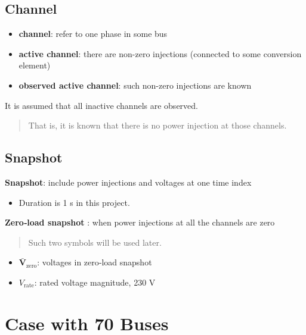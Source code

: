 \documentclass[
]{book}
\providecommand{\tightlist}{%
  \setlength{\itemsep}{0pt}\setlength{\parskip}{0pt}}
\begin{document}
\hypertarget{channel}{%
\subsection*{Channel}\label{channel}}

\begin{itemize}
\tightlist
\item
  \textbf{channel}: refer to one phase in some bus
\item
  \textbf{active channel}: there are non-zero injections (connected to some
  conversion element)
\item
  \textbf{observed active channel}: such non-zero injections are known
\end{itemize}

It is assumed that all inactive channels are observed.

\begin{quote}
That is, it is known that there is no power injection at those channels.
\end{quote}

\hypertarget{snapshot}{%
\subsection*{Snapshot}\label{snapshot}}

\textbf{Snapshot}: include power injections and voltages at one time index

\begin{itemize}
\tightlist
\item
  Duration is 1 s in this project.
\end{itemize}

\textbf{Zero‐load snapshot} : when power injections at all the channels are zero

\begin{quote}
Such two symbols will be used later.
\end{quote}

\begin{itemize}
\tightlist
\item
  \(\boldsymbol{\bar{V}}_\text{zero}\): voltages in zero‐load snapshot
\item
  \(V_\text{rate}\): rated voltage magnitude, 230 V
\end{itemize}

\hypertarget{case}{%
\section{Case with 70 Buses}\label{case}}
\end{document}
